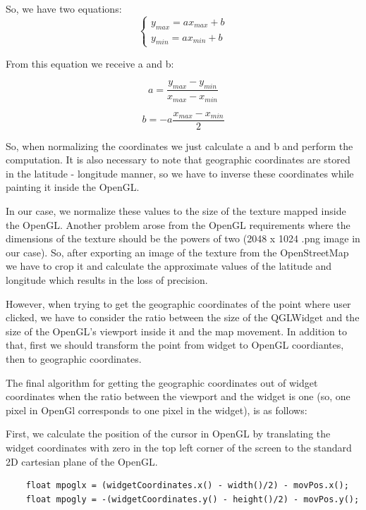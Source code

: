 \documentclass{article}
\begin{document}
So, we have two equations:
$$
\begin{cases}
y_{max} = ax_{max} + b \\
y_{min} = ax_{min} + b
\end{cases}
$$

From this equation we receive a and b:

\begin{equation}
a = \frac{y_{max} - y_{min}}{x_{max} - x_{min}}
\end{equation}

\begin{equation}
b = -a\frac{x_{max} - x_{min}}{2}
\end{equation}

So, when normalizing the coordinates we just calculate a and b and perform the computation. It is also necessary to note that geographic coordinates are stored in the latitude - longitude manner, so we have to inverse these coordinates while painting it inside the OpenGL.

In our case, we normalize these values to the size of the texture mapped inside the OpenGL. Another problem arose from the OpenGL requirements where the dimensions of the texture should be the powers of two (2048 x 1024 .png image in our case). So, after exporting an image of the texture from the OpenStreetMap we have to crop it and calculate the approximate values of the latitude and longitude which results in the loss of precision.

However, when trying to get the geographic coordinates of the point where user clicked, we have to consider the ratio between the size of the QGLWidget and the size of the OpenGL's viewport inside it and the map movement. In addition to that, first we should transform the point from widget to OpenGL coordiantes, then to geographic coordinates.

The final algorithm for getting the geographic coordinates out of widget coordinates when the ratio between the viewport and the widget is one (so, one pixel in OpenGl corresponds to one pixel in the widget), is as follows:

First, we calculate the position of the cursor in OpenGL by translating the widget coordinates with zero in the top left corner of the screen to the standard 2D cartesian plane of the OpenGL.

\begin{lstlisting}
    float mpoglx = (widgetCoordinates.x() - width()/2) - movPos.x();
    float mpogly = -(widgetCoordinates.y() - height()/2) - movPos.y();
\end{lstlisting}
\end{document}
